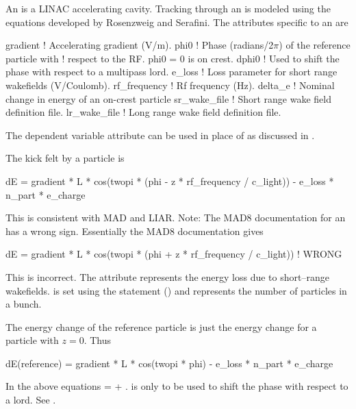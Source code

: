 {{An  is a LINAC accelerating cavity.
Tracking through an  is modeled using the equations
developed by Rosenzweig and Serafini\cite{b:rosenzweig}. The
attributes specific to an  are 
\begin{example}
  gradient     ! Accelerating gradient (V/m).
  phi0         ! Phase (radians/2\(\pi\)) of the reference particle with 
               !   respect to the RF. phi0 = 0 is on crest.
  dphi0        ! Used to shift the phase with respect to a multipass lord.
  e_loss       ! Loss parameter for short range wakefields (V/Coulomb).
  rf_frequency ! Rf frequency (Hz).
  delta_e      ! Nominal change in energy of an on-crest particle
  sr_wake_file ! Short range wake field definition file.
  lr_wake_file ! Long range wake field definition file.
\end{example}
The dependent variable  attribute can be used in place of
 as discussed in .

The kick felt by a particle is 
\begin{example}
  dE = gradient * L * cos(twopi * (phi - z * rf_frequency / c_light)) - 
                                                   e_loss * n_part * e_charge 
\end{example}
This is consistent with MAD and LIAR. Note: The MAD8 documentation 
for an  has a wrong sign. Essentially the MAD8 documentation gives
\begin{example}
  dE = gradient * L * cos(twopi * (phi + z * rf_frequency / c_light)) ! WRONG
\end{example}
This is incorrect. The  attribute represents the energy loss due to 
short--range wakefields.  is set using the  statement 
() and represents the number of particles in a bunch. 

The energy change of the reference particle is just the energy change for a 
particle with $z = 0$. Thus
\begin{example}
  dE(reference) = gradient * L * cos(twopi * phi) - e_loss * n_part * e_charge
\end{example}

In the above equations  =  + . 
is only to be used to shift the phase with respect to a 
lord. See .

}}
